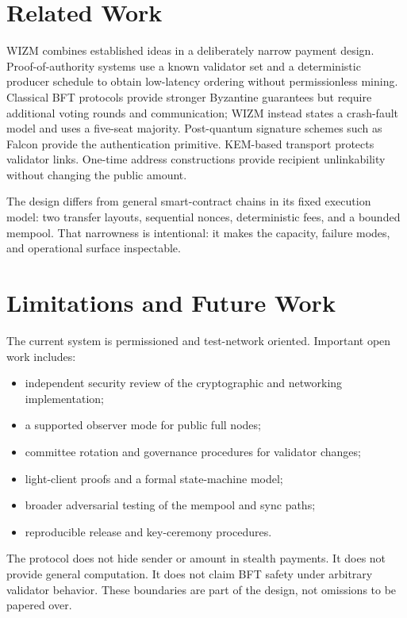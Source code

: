 \documentclass[11pt,a4paper]{article}
\begin{document}
\section{Related Work}

WIZM combines established ideas in a deliberately narrow payment design.
Proof-of-authority systems use a known validator set and a deterministic
producer schedule to obtain low-latency ordering without permissionless
mining. Classical BFT protocols provide stronger Byzantine guarantees but
require additional voting rounds and communication; WIZM instead states a
crash-fault model and uses a five-seat majority. Post-quantum signature
schemes such as Falcon provide the authentication primitive. KEM-based
transport protects validator links. One-time address constructions provide
recipient unlinkability without changing the public amount.

The design differs from general smart-contract chains in its fixed execution
model: two transfer layouts, sequential nonces, deterministic fees, and a
bounded mempool. That narrowness is intentional: it makes the capacity,
failure modes, and operational surface inspectable.

\section{Limitations and Future Work}

The current system is permissioned and test-network oriented. Important open
work includes:
\begin{itemize}[leftmargin=*]
  \item independent security review of the cryptographic and networking
        implementation;
  \item a supported observer mode for public full nodes;
  \item committee rotation and governance procedures for validator changes;
  \item light-client proofs and a formal state-machine model;
  \item broader adversarial testing of the mempool and sync paths;
  \item reproducible release and key-ceremony procedures.
\end{itemize}

The protocol does not hide sender or amount in stealth payments. It does not
provide general computation. It does not claim BFT safety under arbitrary
validator behavior. These boundaries are part of the design, not omissions to
be papered over.
\end{document}
